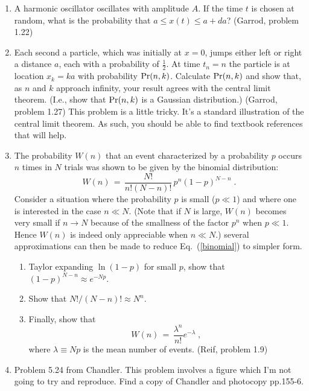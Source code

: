 \begin{enumerate}
\begin{enumerate}
\end{enumerate}

\item A harmonic oscillator oscillates with amplitude $A$.  If the
time $t$ is chosen at random, what is the probability that $a \leq
x(t) \leq a + da$?  (Garrod, problem 1.22)

\item Each second a particle, which was initially at $x=0$, jumps
either left or right a distance $a$, each with a probability of
$\frac{1}{2}$.  At time $t_n = n$ the particle is at location $x_k =
ka$ with probability ${\rm Pr}(n,k)$.  Calculate ${\rm Pr}(n,k)$ and
show that, as $n$ and $k$ approach infinity, your result agrees with
the central limit theorem.  (I.e., show that ${\rm Pr}(n,k)$ is a
Gaussian distribution.)  (Garrod, problem 1.27)  This problem is a
little tricky.  It's a standard illustration of the central limit
theorem.  As such, you should be able to find textbook references that
will help.

\item The probability $W(n)$ that an event characterized by a
probability $p$ occurs $n$ times in $N$ trials was shown to be given
by the binomial distribution:
\begin{equation}
  W(n) \, = \, \frac{N!}{n!(N-n)!}\, p^n(1-p)^{N-n} \;.
\label{binomial}
\end{equation}
Consider a situation where the probability $p$ is small ($p \ll 1$)
and where one is interested in the case $n \ll N$.  (Note that if $N$
is large, $W(n)$ becomes very small if $n \rightarrow N$ because of
the smallness of the factor $p^n$ when $p \ll 1$.  Hence $W(n)$ is
indeed only appreciable when $n \ll N$.) several approximations can
then be made to reduce Eq.~(\ref{binomial}) to simpler form.
\begin{enumerate}

\item Taylor expanding $\ln(1-p)$ for small $p$, show that
$(1-p)^{N-n} \approx e^{-Np} $. 

\item Show that $N!/(N-n)! \approx N^n $. 

\item Finally, show that
\begin{equation}
  W(n) \, = \, \frac{ \lambda^n}{n!} e^{-\lambda} \;,
\end{equation}
where $\lambda \equiv Np$ is the mean number of events.  
(Reif, problem 1.9)
\end{enumerate}


\item Problem 5.24 from Chandler.  This problem involves a figure
which I'm not going to try and reproduce.  Find a copy of Chandler and
photocopy pp.155-6.    



\end{enumerate}






